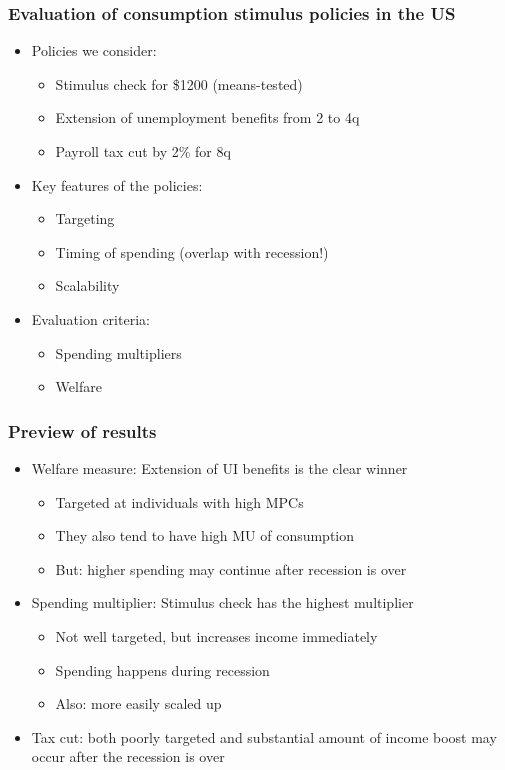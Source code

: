 \documentclass[pdflatex]{beamer}
\begin{document}
\begin{frame}
\frametitle{Evaluation of consumption stimulus policies in the US}
\begin{itemize}
\itemsep = .5\bigskipamount 
\item Policies we consider: 
\begin{itemize}
	\itemsep = .25\bigskipamount 
	\item Stimulus check for \$1200 (means-tested)
	\item Extension of unemployment benefits from 2 to 4q
	\item Payroll tax cut by 2\% for 8q
\end{itemize}
\item Key features of the policies: 
\begin{itemize}
	\itemsep = .25\bigskipamount 
	\item Targeting 
	\item Timing of spending (overlap with recession!)
	\item Scalability 
\end{itemize}
\item Evaluation criteria: 
\begin{itemize}
	\itemsep = .25\bigskipamount 
	\item Spending multipliers 
	\item Welfare 
\end{itemize}
\end{itemize}
\end{frame}


\begin{frame}
\frametitle{Preview of results}
\begin{itemize}
\itemsep = \bigskipamount 
\item Welfare measure: Extension of UI benefits is the clear winner 
\begin{itemize}
\itemsep = .25\bigskipamount 
\item Targeted at individuals with high MPCs 
\item They also tend to have high MU of consumption 
\item But: higher spending may continue after recession is over 
\end{itemize}
\item Spending multiplier: Stimulus check has the highest multiplier 
\begin{itemize}
\itemsep = .25\bigskipamount 
\item Not well targeted, but increases income immediately 
\item Spending happens during recession 
\item Also: more easily scaled up 
\end{itemize}
\item Tax cut: both poorly targeted and substantial amount of income boost may occur after the recession is over
\end{itemize}
\end{frame}
\end{document}
